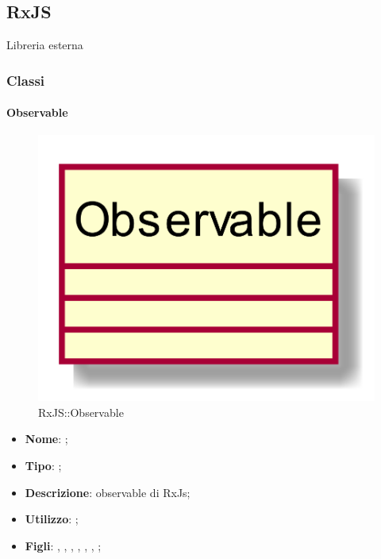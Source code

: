 \subsection{RxJS}
Libreria esterna
\subsubsection{Classi}
\hypertarget{Observable_label}{\paragraph{Observable}}
\begin{figure}[h]
	\centering
	\includegraphics[width=\textwidth,height=\textheight,keepaspectratio]{images/ClassObservable.png}
	\caption{RxJS::Observable}
\end{figure}
\begin{itemize}
	\item \textbf{Nome}: ;
	\item \textbf{Tipo}: ;
	\item \textbf{Descrizione}: observable di RxJs;
	\item \textbf{Utilizzo}: ;
	\item \textbf{Figli}: , , , , , , ;
\end{itemize}

